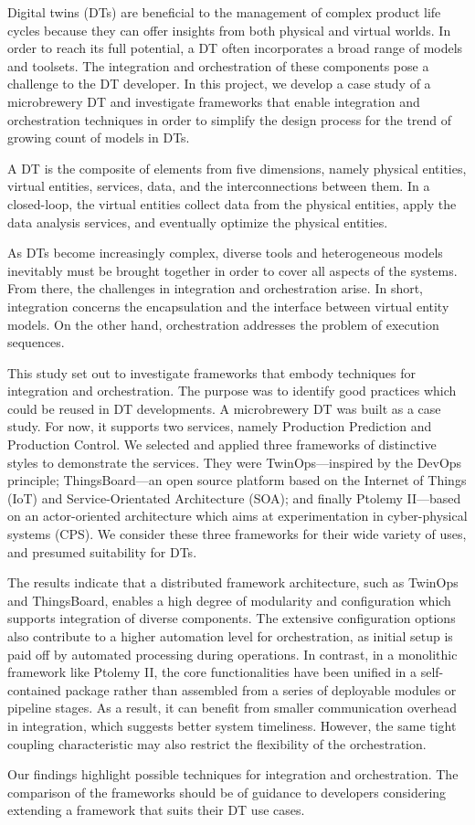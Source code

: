 Digital twins (DTs) are beneficial to the management of complex product life cycles because they can offer insights from both physical and virtual worlds. In order to reach its full potential, a DT often incorporates a broad range of models and toolsets. The integration and orchestration of these components pose a challenge to the DT developer. In this project, we develop a case study of a microbrewery DT and investigate frameworks that enable integration and orchestration techniques in order to simplify the design process for the trend of growing count of models in DTs.

A DT is the composite of elements from five dimensions, namely physical entities, virtual entities, services, data, and the interconnections between them. In a closed-loop, the virtual entities collect data from the physical entities, apply the data analysis services, and eventually optimize the physical entities. 

As DTs become increasingly complex, diverse tools and heterogeneous models inevitably must be brought together in order to cover all aspects of the systems. From there, the challenges in integration and orchestration arise. In short, integration concerns the encapsulation and the interface between virtual entity models. On the other hand, orchestration addresses the problem of execution sequences.
  
This study set out to investigate frameworks that embody techniques for integration and orchestration. The purpose was to identify good practices which could be reused in DT developments. A microbrewery DT was built as a case study. For now, it supports two services, namely Production Prediction and Production Control. We selected and applied three frameworks of distinctive styles to demonstrate the services. They were TwinOps---inspired by the DevOps principle; ThingsBoard---an open source platform based on the Internet of Things (IoT) and Service-Orientated Architecture (SOA); and finally Ptolemy II---based on an actor-oriented architecture which aims at experimentation in cyber-physical systems (CPS). We consider these three frameworks for their wide variety of uses, and presumed suitability for DTs.

The results indicate that a distributed framework architecture, such as TwinOps and ThingsBoard, enables a high degree of modularity and configuration which supports integration of diverse components. The extensive configuration options also contribute to a higher automation level for orchestration, as initial setup is paid off by automated processing during operations. In contrast, in a monolithic framework like Ptolemy II, the core functionalities have been unified in a self-contained package rather than assembled from a series of deployable modules or pipeline stages. As a result, it can benefit from smaller communication overhead in integration, which suggests better system timeliness. However, the same tight coupling characteristic may also restrict the flexibility of the orchestration.

Our findings highlight possible techniques for integration and orchestration. The comparison of the frameworks should be of guidance to developers considering extending a framework that suits their DT use cases.
 
